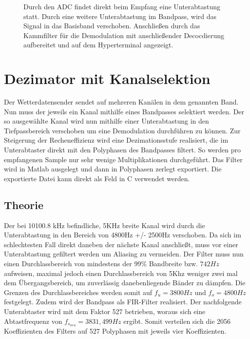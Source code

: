 \documentclass{article}
\begin{document}
\begin{figure}[!h]
    \centering
    \def\svgscale{0.5}
    \def\svgwidth{\columnwidth}
    \caption{Durch den ADC findet direkt beim Empfang eine Unterabtastung statt. Durch eine weitere Unterabtastung im Bandpass, wird das Signal in das Basisband verschoben.
    Anschließen durch das Kammfilter für die Demodulation mit anschließender Decocdierung aufbereitet und auf dem Hyperterminal angezeigt.}
    \label{fig:signal}
\end{figure}

\section{Dezimator mit Kanalselektion}\label{sec:FIR}
Der Wetterdatensender sendet auf mehreren Kanälen in dem genannten Band. Nun muss der jeweils ein Kanal mithilfe eines Bandpasses selektiert werden. Der so ausgewählte Kanal wird nun mithilfe einer Unterabtastung in den Tiefpassbereich verschoben um eine Demodulation durchführen zu können. Zur Steigerung der Recheneffizienz wird eine Dezimationsstufe realisiert, die im Unterabtaster direkt mit den Polyphasen des Bandpasses filtert. So werden pro empfangenen Sample nur sehr wenige Multiplikationen durchgeführt. Das Filter wird in Matlab ausgelegt und dann in Polyphasen zerlegt exportiert. Die exportierte Datei kann direkt als Feld in C verwendet werden.

\subsection{Theorie}
Der bei 10100.8 kHz befindliche, 5KHz breite Kanal wird durch die Unterabtastung in den Bereich von 4800Hz +/- 2500Hz verschoben. Da sich im schlechtesten Fall direkt daneben der nächste Kanal anschließt, muss vor einer Unterabtastung gefiltert werden um Aliasing zu vermeiden. Der Filter muss nun einen Durchlassbereich von mindestens der 99\% Bandbreite bzw. $742Hz$ aufweisen, maximal jedoch einen Durchlassbereich von 5Khz weniger zwei mal dem Übergangsbereich, um zuverlässig danebenliegende Bänder zu dämpfen. Die Grenzen des Durchlassbereiches werden somit auf $f_u = 3800Hz$ und $f_o = 4800Hz$ festgelegt. Zudem wird der Bandpass als FIR-Filter realisiert. Der nachfolgende Unterabtaster wird mit dem Faktor 527 betrieben, woraus sich eine Abtastfrequenz von $f_{s_{neu}} = 3831,499Hz$ ergibt. Somit verteilen sich die 2056 Koeffizienten des Filters auf 527 Polyphasen mit jeweils vier Koeffizienten.
\end{document}

